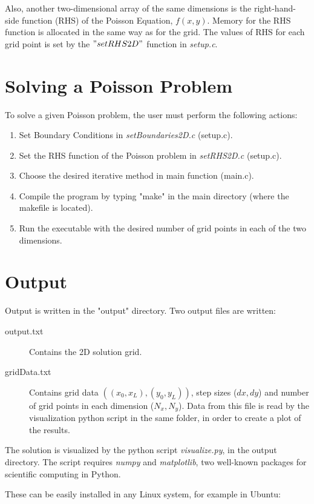 \documentclass[11pt]{report}
\begin{document}
Also, another two-dimensional array of the same dimensions is the right-hand-side function (RHS) of the Poisson Equation, $f(x,y)$. Memory for the RHS function is allocated in the same way as for the grid. The values of RHS for each grid point is set by the $"setRHS2D"$ function in \emph{setup.c}.

\section{Solving a Poisson Problem}
To solve a given Poisson problem, the user must perform the following actions:

\begin{enumerate}
  \item Set Boundary Conditions in \emph{setBoundaries2D.c} (setup.c).
  \item Set the RHS function of the Poisson problem in \emph{setRHS2D.c} (setup.c).
  \item Choose the desired iterative method in main function (main.c).
  \item Compile the program by typing "make" in the main directory (where the makefile is located).
  \item Run the executable with the desired number of grid points in each of the two dimensions.
\end{enumerate}

\section{Output}
Output is written in the "output" directory. Two output files are written:

\begin{description}
  \item[output.txt] Contains the 2D solution grid.
  \item[gridData.txt] Contains grid data $\left( (x_0, x_L), (y_0, y_L) \right) $, step sizes ($dx, dy$) and number of grid points in each dimension ($N_x, N_y$). Data from this file is read by the visualization python script in the same folder, in order to create a plot of the results.
\end{description}

The solution is visualized by the python script \emph{visualize.py}, in the output directory.
The script requires \emph{numpy} and \emph{matplotlib}, two well-known packages for scientific computing in Python.

These can be easily installed in any Linux system, for example in Ubuntu:
\end{document}
